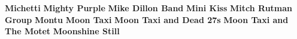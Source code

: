 \vspace{10pt} 
\noindent \textbf{Michetti}\newline
\vspace{10pt} 
\newline
\vspace{10pt} 
\noindent \textbf{Mighty Purple}\newline
\vspace{10pt} 
\newline
\vspace{10pt} 
\noindent \textbf{Mike Dillon Band}\newline
\vspace{10pt} 
\newline
\vspace{10pt} 
\noindent \textbf{Mini Kiss}\newline
\vspace{10pt} 
\newline
\vspace{10pt} 
\noindent \textbf{Mitch Rutman Group}\newline
\vspace{10pt} 
\newline
\vspace{10pt} 
\noindent \textbf{Montu}\newline
\vspace{10pt} 
\newline
\vspace{10pt} 
\noindent \textbf{Moon Taxi}\newline
\vspace{10pt} 
\newline
\vspace{10pt} 
\noindent \textbf{Moon Taxi and Dead 27s}\newline
\vspace{10pt} 
\newline
\vspace{10pt} 
\noindent \textbf{Moon Taxi and The Motet}\newline
\vspace{10pt} 
\newline
\vspace{10pt} 
\noindent \textbf{Moonshine Still}\newline
